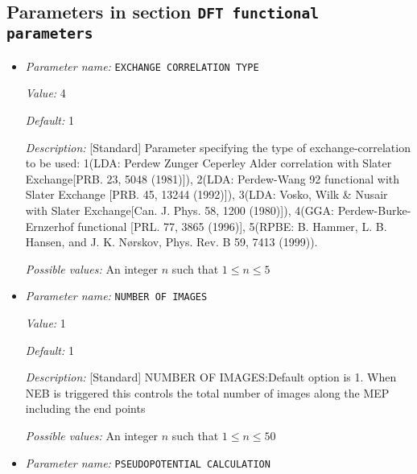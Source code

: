 \subsection{Parameters in section \tt DFT functional parameters}
\label{parameters:DFT_20functional_20parameters}

\begin{itemize}
\item {\it Parameter name:} {\tt EXCHANGE CORRELATION TYPE}
\label{parameters:DFT functional parameters/EXCHANGE CORRELATION TYPE}
\label{parameters:DFT_20functional_20parameters/EXCHANGE_20CORRELATION_20TYPE}


{\it Value:} 4


{\it Default:} 1


{\it Description:} [Standard] Parameter specifying the type of exchange-correlation to be used: 1(LDA: Perdew Zunger Ceperley Alder correlation with Slater Exchange[PRB. 23, 5048 (1981)]), 2(LDA: Perdew-Wang 92 functional with Slater Exchange [PRB. 45, 13244 (1992)]), 3(LDA: Vosko, Wilk \& Nusair with Slater Exchange[Can. J. Phys. 58, 1200 (1980)]), 4(GGA: Perdew-Burke-Ernzerhof functional [PRL. 77, 3865 (1996)], 5(RPBE: B. Hammer, L. B. Hansen, and J. K. Nørskov, Phys. Rev. B 59, 7413 (1999)).


{\it Possible values:} An integer $n$ such that $1\leq n \leq 5$
\item {\it Parameter name:} {\tt NUMBER OF IMAGES}
\label{parameters:DFT functional parameters/NUMBER OF IMAGES}
\label{parameters:DFT_20functional_20parameters/NUMBER_20OF_20IMAGES}


{\it Value:} 1


{\it Default:} 1


{\it Description:} [Standard] NUMBER OF IMAGES:Default option is 1. When NEB is triggered this controls the total number of images along the MEP including the end points


{\it Possible values:} An integer $n$ such that $1\leq n \leq 50$
\item {\it Parameter name:} {\tt PSEUDOPOTENTIAL CALCULATION}
\label{parameters:DFT functional parameters/PSEUDOPOTENTIAL CALCULATION}
\label{parameters:DFT_20functional_20parameters/PSEUDOPOTENTIAL_20CALCULATION}



\end{itemize}
